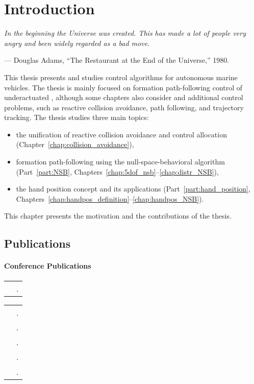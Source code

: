 \chapter{Introduction}
\label{chap:introduction}

\setlength{\epigraphwidth}{0.5\textwidth}
\epigraph{ \it
    In the beginning the Universe was created.
    This has made a lot of people very angry and been widely regarded as a bad move.
}{--- Douglas Adams, ``The Restaurant at the End of the Universe,'' 1980.}

This thesis presents and studies control algorithms for autonomous marine vehicles.
The thesis is mainly focused on formation path-following control of underactuated , although some chapters also consider  and additional control problems, such as reactive collision avoidance, path following, and trajectory tracking.
The thesis studies three main topics:
\begin{itemize}
    \item the unification of reactive collision avoidance and control allocation (Chapter~\ref{chap:collision_avoidance}),
    \item formation path-following using the null-space-behavioral algorithm (Part~\ref{part:NSB}, Chapters~\ref{chap:5dof_nsb}--\ref{chap:distr_NSB}),
    \item the hand position concept and its applications (Part~\ref{part:hand_position}, Chapters~\ref{chap:handpos_definition}--\ref{chap:handpos_NSB}).
\end{itemize}
This chapter presents the motivation and the contributions of the thesis.





\vspace*{-0.25em}
\section{Publications}
\vspace*{-0.5em}
\newcommand{\tablecite}[1]{\cite{#1} & \fullcite{#1}.}

\subsubsection{Conference Publications}
\begin{tabularx}{\textwidth}{rX}
    \tablecite{matous_unifying_2021} 
\end{tabularx}
\begin{tabularx}{\textwidth}{rX}
    \tablecite{matouvs_formation_2022} \\
    \tablecite{matous_singularity_2023} \\
    \tablecite{matous_MPC_2022} \\
    \tablecite{restrepo_formation_2022} \\
    \tablecite{lie_formation_2023}
\end{tabularx}

